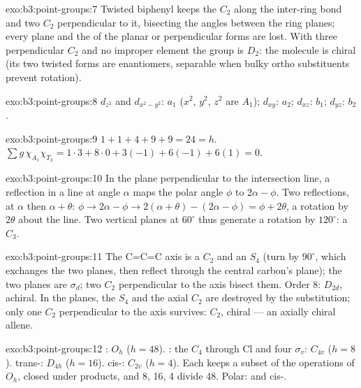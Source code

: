 \begin{solution}{exo:b3:point-groups:7}
Twisted biphenyl keeps the $C_2$ along the inter-ring bond and two $C_2$
perpendicular to it, bisecting the angles between the ring planes; every
plane and the  of the planar or perpendicular forms are
lost. With three perpendicular $C_2$ and no improper element the group is
$D_2$: the molecule is chiral (its two twisted forms are enantiomers,
separable when bulky ortho substituents prevent rotation).
\end{solution}

\begin{solution}{exo:b3:point-groups:8}
$d_{z^2}$ and $d_{x^2-y^2}$: $a_1$ ($x^2$, $y^2$, $z^2$ are $A_1$); $d_{xy}$: $a_2$; $d_{xz}$:
$b_1$; $d_{yz}$: $b_2$.
\end{solution}

\begin{solution}{exo:b3:point-groups:9}
$1 + 1 + 4 + 9 + 9 = 24 = h$. $\sum g\,\chi_{A_1}\chi_{T_2} = 1\cdot3 + 8\cdot0 + 3(-1)
+ 6(-1) + 6(1) = 0$.
\end{solution}

\begin{solution}{exo:b3:point-groups:10}
In the plane perpendicular to the intersection line, a reflection in a line
at angle $\alpha$ maps the polar angle $\phi$ to $2\alpha - \phi$. Two reflections, at
$\alpha$ then $\alpha + \theta$: $\phi \to 2\alpha - \phi \to 2(\alpha + \theta) - (2\alpha - \phi) =
\phi + 2\theta$, a rotation by $2\theta$ about the line. Two vertical planes at
$60^\circ$ thus generate a rotation by $120^\circ$: a $C_3$.
\end{solution}

\begin{solution}{exo:b3:point-groups:11}
The C=C=C axis is a $C_2$ and an $S_4$ (turn by $90^\circ$, which exchanges the
two  planes, then reflect through the central carbon's plane); the two
 planes are $\sigma_d$; two $C_2$ perpendicular to the axis bisect them.
Order 8: $D_{2d}$, achiral. In  the planes, the $S_4$ and the axial
$C_2$ are destroyed by the substitution; only one $C_2$ perpendicular to the
axis survives: $C_2$, chiral --- an axially chiral allene.
\end{solution}

\begin{solution}{exo:b3:point-groups:12}
: $O_h$ ($h = 48$). : the $C_4$ through Cl and four $\sigma_v$:
$C_{4v}$ ($h = 8$). trans-: $D_{4h}$ ($h = 16$). cis-: $C_{2v}$ ($h
= 4$). Each keeps a subset of the operations of $O_h$, closed under products,
and 8, 16, 4 divide 48. Polar:  and cis-.
\end{solution}

